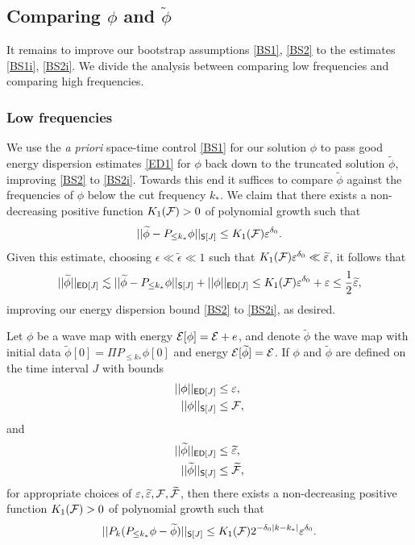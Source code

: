 \subsection{Comparing $\phi$ and $\widetilde\phi$}

It remains to improve our bootstrap assumptions \eqref{BS1}, \eqref{BS2} to the estimates \eqref{BS1i}, \eqref{BS2i}. We divide the analysis between comparing low frequencies and comparing high frequencies. 

\subsubsection{Low frequencies}

We use the \textit{a priori} space-time control \eqref{BS1} for our solution $\phi$ to pass good energy dispersion estimates \eqref{ED1} for $\phi$ back down to the truncated solution $\widetilde\phi$, improving \eqref{BS2} to \eqref{BS2i}. Towards this end it suffices to compare $\widetilde \phi$ against the frequencies of $\phi$ below the cut frequency $k_*$. We claim that there exists a non-decreasing positive function $K_1 (\mathcal F) > 0$ of polynomial growth such that 
	\[
		|| \widetilde \phi - P_{\leq k_*} \phi||_{\mathsf S[J]} \leq K_{1} (\mathcal F) \varepsilon^{\delta_0}.
	\]
Given this estimate, choosing $\epsilon \ll \widetilde\epsilon \ll 1$ such that $K_{1} (\mathcal F) \varepsilon^{\delta_0} \ll \widetilde {\varepsilon}$, it follows that
	\[
		||\widetilde \phi ||_{\mathsf{ED} [J]}
			\lesssim || \widetilde \phi - P_{\leq k_*} \phi||_{\mathsf S[J]} + ||\phi ||_{\mathsf{ED}[J]} \leq K_{1} (\mathcal F) \varepsilon^{\delta_0} + \varepsilon \leq \frac12 \widetilde{\varepsilon},
	\]
improving our energy dispersion bound \eqref{BS2} to \eqref{BS2i}, as desired.

\begin{proposition}
	Let $\phi$ be a wave map with energy $\mathcal E[\phi] = \mathcal E + e$, and denote $\widetilde \phi$ the wave map with initial data $\widetilde \phi[0] = \Pi P_{\leq k_*} \phi[0]$ and energy $\mathcal E[\widetilde \phi] = \mathcal E$. If $\phi$ and $\widetilde \phi$ are defined on the time interval $J$ with bounds
		\begin{align}
			||\phi||_{\mathsf{ED}[J]} 
				&\leq \varepsilon, \\
			||\phi||_{\mathsf S[J]}
				&\leq \mathcal F, 	
		\end{align}
	and
		\begin{align}
			||\widetilde\phi||_{\mathsf{ED}[J]} 
				&\leq \widetilde{\varepsilon}, \\
			||\widetilde\phi||_{\mathsf S[J]}
				&\leq \widetilde{\mathcal F}, 	
		\end{align}	
	for appropriate choices of $\varepsilon, \widetilde{\varepsilon}, \mathcal F, \widetilde{\mathcal F}$, then there exists a non-decreasing positive function $K_{1}(\mathcal F) > 0$ of polynomial growth such that 
	\begin{equation}
		||P_k (P_{\leq k_*} \phi - \widetilde \phi)||_{\mathsf S[J]} \leq K_{1} (\mathcal F) 2^{-\delta_0 |k - k_*|} \varepsilon^{\delta_0}.\label{eq:lowfreq}
	\end{equation}\label{prop:lowfreq}
\end{proposition}


